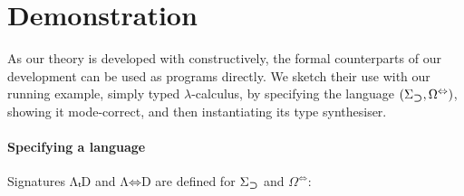 \documentclass[BiSig.tex]{subfiles}
\newcommand{\Conid}[1]{\mathit{#1}}
\newcommand{\Varid}[1]{\mathit{#1}}
\renewcommand\Varid[1]{\mathord{\textsf{#1}}}
\let\Conid\Varid
\begin{document}
\section{Demonstration} \label{sec:formalisation}
As our theory is developed with \Agda constructively, the formal counterparts of our development can be used as programs directly.
We sketch their use with our running example, simply typed $\lambda$-calculus, by specifying the language $(\Sigma_{\mathbin{\bm{\supset}}}, \Omega^{\Leftrightarrow})$, showing it mode-correct, and then instantiating its type synthesiser.

\paragraph{Specifying a language}
Signatures \ensuremath{\Conid{ΛₜD}} and \ensuremath{\Conid{Λ⇔D}} are defined for $\Sigma_{\mathbin{\bm{\supset}}}$ and $\Omega^{\Leftrightarrow}$: 
\end{document}
